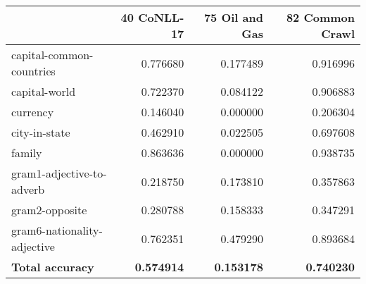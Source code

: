 \begin{tabular}{lrrr}
\toprule
{} &  40 CoNLL-17 &  75 Oil and Gas &  82 Common Crawl \\
\midrule
capital-common-countries    &     0.776680 &        0.177489 &         0.916996 \\
capital-world               &     0.722370 &        0.084122 &         0.906883 \\
currency                    &     0.146040 &        0.000000 &         0.206304 \\
city-in-state               &     0.462910 &        0.022505 &         0.697608 \\
family                      &     0.863636 &        0.000000 &         0.938735 \\
gram1-adjective-to-adverb   &     0.218750 &        0.173810 &         0.357863 \\
gram2-opposite              &     0.280788 &        0.158333 &         0.347291 \\
gram6-nationality-adjective &     0.762351 &        0.479290 &         0.893684 \\
\textbf{Total accuracy}              &     \textbf{0.574914} &        \textbf{0.153178} &         \textbf{0.740230} \\
\bottomrule
\end{tabular}
